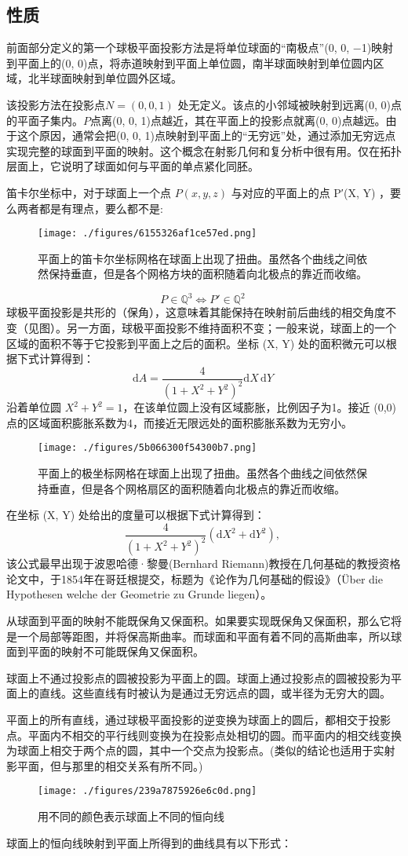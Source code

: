 \subsection{性质}
前面部分定义的第一个球极平面投影方法是将单位球面的“南极点”(0, 0, −1)映射到平面上的(0, 0)点，将赤道映射到平面上单位圆，南半球面映射到单位圆内区域，北半球面映射到单位圆外区域。

该投影方法在投影点$N = (0, 0, 1)$ 处无定义。该点的小邻域被映射到远离(0, 0)点的平面子集内。$P$点离(0, 0, 1)点越近，其在平面上的投影点就离(0, 0)点越远。由于这个原因，通常会把(0, 0, 1)点映射到平面上的“无穷远”处，通过添加无穷远点实现完整的球面到平面的映射。这个概念在射影几何和复分析中很有用。仅在拓扑层面上，它说明了球面如何与平面的单点紧化同胚。

笛卡尔坐标中，对于球面上一个点 $P(x, y, z)$ 与对应的平面上的点 P′(X, Y) ，要么两者都是有理点，要么都不是:
\begin{figure}[ht]
\centering
\texttt{[image: ./figures/6155326af1ce57ed.png]}
\caption{平面上的笛卡尔坐标网格在球面上出现了扭曲。虽然各个曲线之间依然保持垂直，但是各个网格方块的面积随着向北极点的靠近而收缩。} \label{fig_QJPMTY_6}
\end{figure}
$$P \in \mathbb{Q}^3 \Longleftrightarrow P' \in \mathbb{Q}^2~$$
球极平面投影是共形的（保角），这意味着其能保持在映射前后曲线的相交角度不变（见图）。另一方面，球极平面投影不维持面积不变；一般来说，球面上的一个区域的面积不等于它投影到平面上之后的面积。坐标 (X, Y) 处的面积微元可以根据下式计算得到：
$$\mathrm{d}A = \frac{4}{(1 + X^2 + Y^2)^2} \mathrm{d}X \, \mathrm{d}Y~$$
沿着单位圆 \(X^2 + Y^2 = 1\)，在该单位圆上没有区域膨胀，比例因子为1。接近 (0,0) 点的区域面积膨胀系数为4，而接近无限远处的面积膨胀系数为无穷小。
\begin{figure}[ht]
\centering
\texttt{[image: ./figures/5b066300f54300b7.png]}
\caption{平面上的极坐标网格在球面上出现了扭曲。虽然各个曲线之间依然保持垂直，但是各个网格扇区的面积随着向北极点的靠近而收缩。} \label{fig_QJPMTY_7}
\end{figure}
在坐标 (X, Y) 处给出的度量可以根据下式计算得到：
$$\frac{4}{(1 + X^2 + Y^2)^2} (\mathrm{d}X^2 + \mathrm{d}Y^2),~$$
该公式最早出现于波恩哈德·黎曼(Bernhard Riemann)教授在几何基础的教授资格论文中，于1854年在哥廷根提交，标题为《论作为几何基础的假设》（Über die Hypothesen welche der Geometrie zu Grunde liegen）。

从球面到平面的映射不能既保角又保面积。如果要实现既保角又保面积，那么它将是一个局部等距图，并将保高斯曲率。而球面和平面有着不同的高斯曲率，所以球面到平面的映射不可能既保角又保面积。

球面上不通过投影点的圆被投影为平面上的圆。球面上通过投影点的圆被投影为平面上的直线。这些直线有时被认为是通过无穷远点的圆，或半径为无穷大的圆。

平面上的所有直线，通过球极平面投影的逆变换为球面上的圆后，都相交于投影点。平面内不相交的平行线则变换为在投影点处相切的圆。而平面内的相交线变换为球面上相交于两个点的圆，其中一个交点为投影点。(类似的结论也适用于实射影平面，但与那里的相交关系有所不同。)
\begin{figure}[ht]
\centering
\texttt{[image: ./figures/239a7875926e6c0d.png]}
\caption{用不同的颜色表示球面上不同的恒向线} \label{fig_QJPMTY_8}
\end{figure}
球面上的恒向线映射到平面上所得到的曲线具有以下形式：